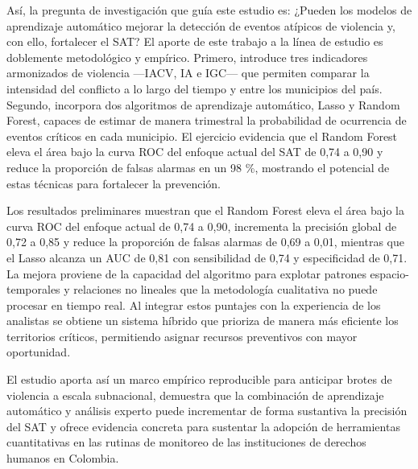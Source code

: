 Así, la pregunta de investigación que guía este estudio es: ¿Pueden los modelos de aprendizaje automático mejorar la detección de eventos atípicos de violencia y, con ello, fortalecer el SAT? El aporte de este trabajo a la línea de estudio es doblemente metodológico y empírico. Primero, introduce tres indicadores armonizados de violencia —IACV, IA e IGC— que permiten comparar la intensidad del conflicto a lo largo del tiempo y entre los municipios del país. Segundo, incorpora dos algoritmos de aprendizaje automático, Lasso y Random Forest, capaces de estimar de manera trimestral la probabilidad de ocurrencia de eventos críticos en cada municipio. El ejercicio evidencia que el Random Forest eleva el área bajo la curva ROC del enfoque actual del SAT de 0,74 a 0,90 y reduce la proporción de falsas alarmas en un 98 \%, mostrando el potencial de estas técnicas para fortalecer la prevención. 

Los resultados preliminares muestran que el Random Forest eleva el área bajo la curva ROC del enfoque actual de 0,74 a 0,90, incrementa la precisión global de 0,72 a 0,85 y reduce la proporción de falsas alarmas de 0,69 a 0,01, mientras que el Lasso alcanza un AUC de 0,81 con sensibilidad de 0,74 y especificidad de 0,71. La mejora proviene de la capacidad del algoritmo para explotar patrones espacio-temporales y relaciones no lineales que la metodología cualitativa no puede procesar en tiempo real. Al integrar estos puntajes con la experiencia de los analistas se obtiene un sistema híbrido que prioriza de manera más eficiente los territorios críticos, permitiendo asignar recursos preventivos con mayor oportunidad.

El estudio aporta así un marco empírico reproducible para anticipar brotes de violencia a escala subnacional, demuestra que la combinación de aprendizaje automático y análisis experto puede incrementar de forma sustantiva la precisión del SAT y ofrece evidencia concreta para sustentar la adopción de herramientas cuantitativas en las rutinas de monitoreo de las instituciones de derechos humanos en Colombia.